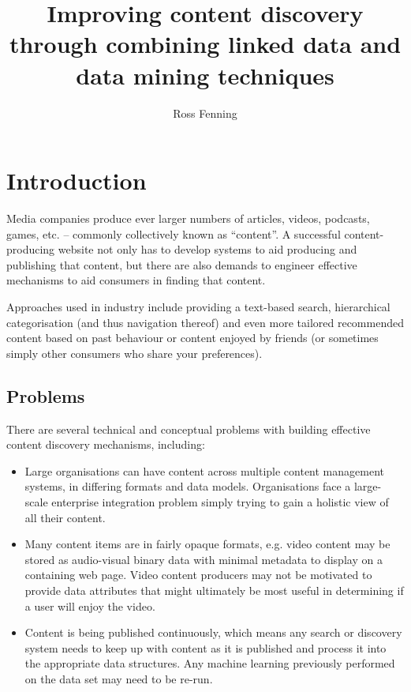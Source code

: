 \documentclass[10pt,a4paper]{report}
\title{Improving content discovery through combining linked data and data mining techniques}
\author{Ross Fenning}
\begin{document}
\maketitle
\tableofcontents

\chapter{Introduction}

Media companies produce ever larger numbers of articles, videos, podcasts,
games, etc. -- commonly collectively known as ``content''. A successful
content-producing website not only has to develop systems to aid producing and
publishing that content, but there are also demands to engineer effective
mechanisms to aid consumers in finding that content.

Approaches used in industry include providing a text-based search, hierarchical
categorisation (and thus navigation thereof) and even more tailored recommended
content based on past behaviour or content enjoyed by friends (or sometimes
simply other consumers who share your preferences).

\section{Problems}

There are several technical and conceptual problems with building effective
content discovery mechanisms, including:

\begin{itemize}

\item Large organisations can have content across multiple content management
systems, in differing formats and data models. Organisations face a large-scale
enterprise integration problem simply trying to gain a holistic view of all
their content.

\item Many content items are in fairly opaque formats, e.g. video content may be
stored as audio-visual binary data with minimal metadata to display on a
containing web page. Video content producers may not be motivated to provide
data attributes that might ultimately be most useful in determining if a user
will enjoy the video.

\item Content is being published continuously, which means any search or
discovery system needs to keep up with content as it is published and process it
into the appropriate data structures. Any machine learning previously performed
on the data set may need to be re-run.

\end{itemize}
\end{document}
